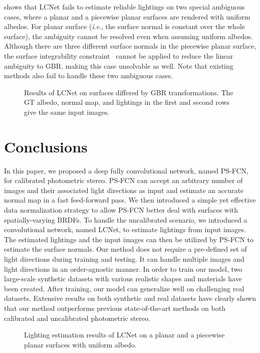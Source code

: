 \documentclass[10pt,journal,compsoc]{IEEEtran}
\newcommand{\ie}{\textit{i}.\textit{e}.}
\newcommand{\rev}[1]{#1}
\begin{document}
\rev{
     shows that LCNet fails to estimate reliable lightings on two special ambiguous cases, where a planar and a piecewise planar surfaces are rendered with uniform albedos. For planar surface (\ie, the surface normal is constant over the whole surface), the ambiguity cannot be resolved even when assuming uniform albedos.
    Although there are three different surface normals in the piecewise planar surface, the surface integrability constraint~\cite{belhumeur1999bas} cannot be applied to reduce the linear ambiguity to GBR, making this case unsolvable as well. Note that existing methods also fail to handle these two ambiguous cases.
}


\begin{figure}[t] \centering
    
    \caption{Results of LCNet on surfaces differed by GBR transformations. The GT albedo, normal map, and lightings in the first and second rows give the same input images.}
    \label{fig:sphere_gbr}
\end{figure}

\section{Conclusions}
In this paper, we proposed a deep fully convolutional network, named PS-FCN, for calibrated photometric stereo. PS-FCN can accept an arbitrary number of images and their associated light directions as input and estimate an accurate normal map in a fast feed-forward pass. 
We then introduced a simple yet effective data normalization strategy to allow PS-FCN better deal with surfaces with spatially-varying BRDFs.
To handle the uncalibrated scenario, we introduced a convolutional network, named LCNet, to estimate lightings from input images. The estimated lightings and the input images can then be utilized by PS-FCN to estimate the surface normals.
Our method does not require a pre-defined set of light directions during training and testing. It can handle multiple images and light directions in an order-agnostic manner.  
In order to train our model, two large-scale synthetic datasets with various realistic shapes and materials have been created. After training, our model can generalize well on challenging real datasets.
Extensive results on both synthetic and real datasets have clearly shown that our method outperforms previous state-of-the-art methods on both calibrated and uncalibrated photometric stereo. 

\begin{figure}[t] \centering
     
    \caption{Lighting estimation results of LCNet on a planar and a piecewise planar surfaces with uniform albedo.}\label{fig:quant_light_plane}
\end{figure}
\end{document}
